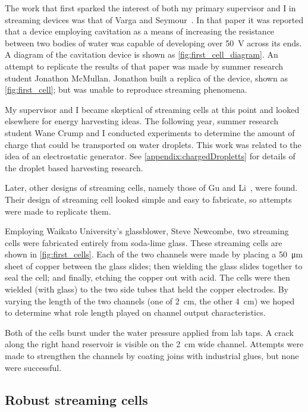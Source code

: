     The work that first sparked the interest of both my primary supervisor and I in streaming devices was that of Varga and Seymour~\cite{Varga1986}.
    In that paper it was reported that a device employing cavitation as a means of increasing the resistance between two bodies of  water was capable of developing over \SI{50}{\volt} across its ends.
    A diagram of the cavitation device is shown as \cref{fig:first_cell_diagram}.
    An attempt to replicate the results of that paper was made by summer research student Jonathon McMullan.
    Jonathon built a replica of the device, shown as \cref{fig:first_cell}; but was unable to reproduce streaming phenomena.

    My supervisor and I became skeptical of streaming cells at this point and looked elsewhere for energy harvesting ideas.
    The following year, summer research student Wane Crump and I conducted experiments to determine the amount of charge that could be transported on water droplets.
    This work was related to the idea of an electrostatic generator.
    See \cref{appendix:chargedDropletts} for details of the droplet based harvesting research.

    Later, other designs of streaming cells, namely those of Gu and Li~\cite{Gu2000}, were found.
    Their design of streaming cell looked simple and easy to fabricate, so attempts were made to replicate them.


    Employing Waikato University's glassblower, Steve Newcombe, two streaming cells were fabricated entirely from soda-lime glass.
    These streaming cells are shown in \cref{fig:first_cells}.
    Each of the two channels were made by placing a \SI{50}{\micro\meter} sheet of copper between the glass slides; then wielding the glass slides together to seal the cell; and finally, etching the copper out with acid.
    The cells were then wielded (with glass) to the two side tubes that held the copper electrodes.
    By varying the length of the two channels (one of \SI{2}{\centi\meter}, the other \SI{4}{\centi\meter}) we hoped to determine what role length played on channel output characteristics.

    Both of the cells burst under the water pressure applied from lab taps.
    A crack along the right hand reservoir is visible on the \SI{2}{\centi\meter} wide channel.
    Attempts were made to strengthen the channels by coating joins with industrial glues, but none were successful.


  \subsection{Robust streaming cells}


